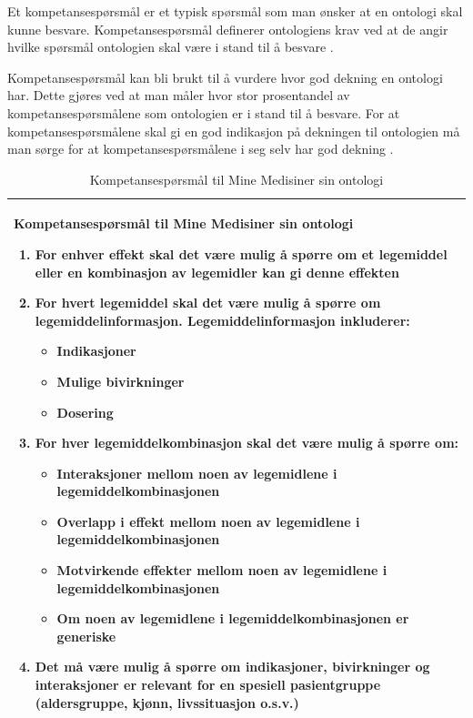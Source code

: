 Et kompetansespørsmål er et typisk spørsmål som man ønsker at en ontologi skal kunne besvare. Kompetansespørsmål definerer ontologiens krav ved at de angir hvilke spørsmål ontologien skal være i stand til å besvare \citep{Gangemi, Fox}.

Kompetansespørsmål kan bli brukt til å vurdere hvor god dekning en ontologi har. Dette gjøres ved at man måler hvor stor prosentandel av kompetansespørsmålene som ontologien er i stand til å besvare. For at kompetansespørsmålene skal gi en god indikasjon på dekningen til ontologien må man sørge for at kompetansespørsmålene i seg selv har god dekning \citep{Rao}.

\begin{table}[H]
    \centering
    \begin{tabularx}{\textwidth}{|X|}
    \hline
        \textbf{Kompetansespørsmål til Mine Medisiner sin ontologi}
        \begin{enumerate}
            \item For enhver effekt skal det være mulig å spørre om et legemiddel eller en kombinasjon av legemidler kan gi denne effekten
            \item For hvert legemiddel skal det være mulig å spørre om legemiddelinformasjon. Legemiddelinformasjon inkluderer:
            \begin{itemize}
                \item Indikasjoner
                \item Mulige bivirkninger
                \item Dosering
            \end{itemize}
            \item For hver legemiddelkombinasjon skal det være mulig å spørre om:
            \begin{itemize}
                \item Interaksjoner  mellom noen av legemidlene i legemiddelkombinasjonen
                \item Overlapp i effekt  mellom noen av legemidlene i legemiddelkombinasjonen
                \item Motvirkende effekter mellom noen av legemidlene i legemiddelkombinasjonen
                \item Om noen av legemidlene i legemiddelkombinasjonen er generiske
            \end{itemize}
            \item Det må være mulig å spørre om indikasjoner, bivirkninger og interaksjoner er relevant for en spesiell pasientgruppe (aldersgruppe, kjønn, livssituasjon o.s.v.) 
        \end{enumerate} \\
    \hline
    \end{tabularx}
    \caption{Kompetansespørsmål til Mine Medisiner sin ontologi}
    \label{tab:kompspm}
\end{table}


